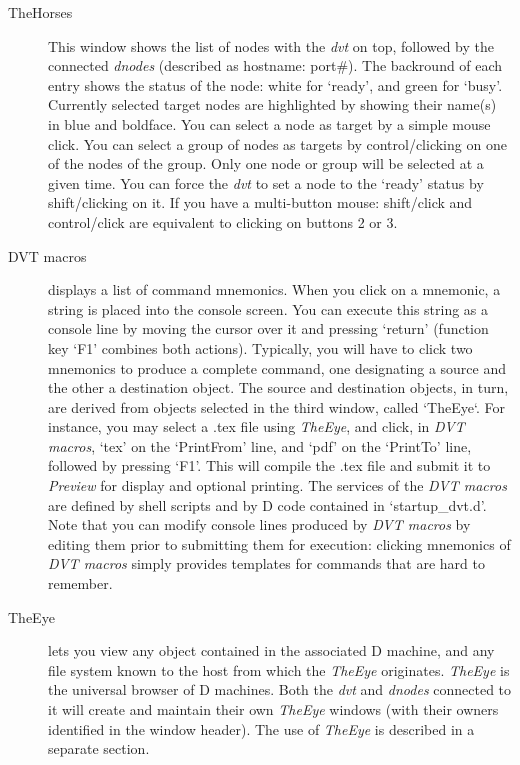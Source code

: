 \begin{description}
\item[TheHorses] This window shows the list of nodes with the \emph{dvt} on top, followed by the connected \emph{dnodes} (described as hostname: port\#). The backround of each entry shows the status of the node: white for `ready', and green for `busy'. Currently selected target nodes are highlighted by showing their name(s) in blue and boldface. You can select a node as target by a simple mouse click. You can select a group of nodes as targets by control/clicking on one of the nodes of the group. Only one node or group will be selected at a given time. You can force the \emph{dvt} to set a node to the `ready' status by shift/clicking on it. If you have a multi-button mouse: shift/click and control/click are equivalent to clicking on buttons 2 or 3.

\item[DVT macros] displays a list of command mnemonics. When you click on a mnemonic, a string is placed into the console screen. You can execute this string as a console line by moving the cursor over it and pressing `return' (function key `F1' combines both actions). Typically, you will have to click two mnemonics to produce a complete command, one designating a source and the other a destination object. The source and destination objects, in turn, are derived from objects selected in the third window, called `TheEye`. For instance, you may select a .tex file using \emph{TheEye}, and click, in \emph{DVT macros}, `tex' on the `PrintFrom' line, and `pdf' on the `PrintTo' line, followed by pressing `F1'. This will compile the .tex file and submit it to \emph{Preview} for display and optional printing. The services of the \emph{DVT macros} are defined by shell scripts and by D code contained in `startup\_dvt.d'. Note that you can modify console lines produced by \emph{DVT macros} by editing them prior to submitting them for execution: clicking mnemonics of \emph{DVT macros} simply provides templates for commands that are hard to remember.

\item[TheEye] lets you view any object contained in the associated D machine, and any file system known to the host from which the \emph{TheEye} originates. \emph{TheEye} is the universal browser of D machines. Both the \emph{dvt} and \emph{dnodes} connected to it will create and maintain their own \emph{TheEye} windows (with their owners identified in the window header). The use of \emph{TheEye} is described in a separate section.

\end{description}

